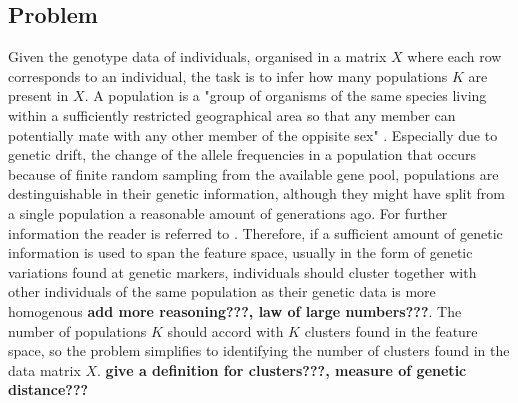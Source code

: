 \documentclass[a4paper, 11pt]{article}
\begin{document}
\subsection{Problem}
Given the genotype data of individuals, organised in a matrix $X$ where each row corresponds to an individual, the task is to infer how many populations $K$ are present in $X$. A population is a "group of organisms of the same species living within a sufficiently restricted geographical area so that any member can potentially mate with any other member of the oppisite sex" \parencite{hartl1997principles}. Especially due to genetic drift, the change of the allele frequencies in a population that occurs because of finite random sampling from the available gene pool, populations are destinguishable in their genetic information, although they might have split from a single population a reasonable amount of generations ago. For further information the reader is referred to \parencite{hartl1997principles}. Therefore, if a sufficient amount of genetic information is used to span the feature space, usually in the form of genetic variations found at genetic markers, individuals should cluster together with other individuals of the same population as their genetic data is more homogenous \textbf{add more reasoning???, law of large numbers???}. The number of populations $K$ should accord with $K$ clusters found in the feature space, so the problem simplifies to identifying the number of clusters found in the data matrix $X$. \textbf{give a definition for clusters???, measure of genetic distance???}
\end{document}
